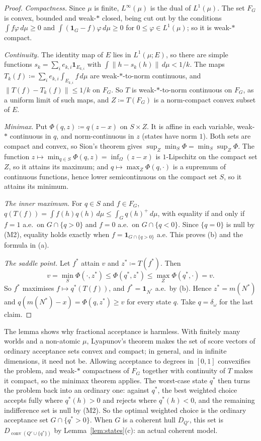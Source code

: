 \documentclass[11pt]{article}
\newcommand{\one}{\mathbf{1}}
\DeclareMathOperator{\conv}{conv}
\theoremstyle{plain}
\theoremstyle{definition}
\theoremstyle{remark}
\begin{document}
\begin{proof}
\emph{Compactness.} Since $\mu$ is finite, $L^\infty(\mu)$ is the dual of $L^1(\mu)$. The set
$F_G$ is convex, bounded and weak-$\ast$ closed, being cut out by the conditions $\int f
\varphi\,d\mu\ge0$ and $\int(\one_G-f)\varphi\,d\mu\ge0$ for $0\le\varphi\in L^1(\mu)$; so it is
weak-$\ast$ compact.

\emph{Continuity.} The identity map of $E$ lies in $L^1(\mu;E)$, so there are simple functions
$s_k=\sum_ie_{k,i}\one_{E_{k,i}}$ with $\int\|h-s_k(h)\|\,d\mu<1/k$. The maps $T_k(f)\coloneqq
\sum_ie_{k,i}\int_{E_{k,i}}f\,d\mu$ are weak-$\ast$-to-norm continuous, and $\|T(f)-T_k(f)\|
\le1/k$ on $F_G$. So $T$ is weak-$\ast$-to-norm continuous on $F_G$, as a uniform limit of
such maps, and $Z\coloneqq T(F_G)$ is a norm-compact convex subset of $E$.

\emph{Minimax.} Put $\Phi(q,z)\coloneqq q(z-x)$ on $S\times Z$. It is affine in each variable,
weak-$\ast$ continuous in $q$, and norm-continuous in $z$ (states have norm $1$). Both sets
are compact and convex, so Sion's theorem \cite{Sion} gives $\sup_Z\min_S\Phi=
\min_S\sup_Z\Phi$. The function $z\mapsto\min_{q\in S}\Phi(q,z)=\inf_\Omega(z-x)$ is $1$-Lipschitz on
the compact set $Z$, so it attains its maximum; and $q\mapsto\max_Z\Phi(q,\cdot)$ is a supremum
of continuous functions, hence lower semicontinuous on the compact set $S$, so it attains its
minimum.

\emph{The inner maximum.} For $q\in S$ and $f\in F_G$, $q(T(f))=\int f(h)q(h)\,d\mu\le\int_G
q(h)^+\,d\mu$, with equality if and only if $f=1$ a.e.\ on $G\cap\{q>0\}$ and $f=0$ a.e.\ on
$G\cap\{q<0\}$. Since $\{q=0\}$ is null by (M2), equality holds exactly when $f=\one_{G\cap
\{q>0\}}$ a.e. This proves (b) and the formula in (a).

\emph{The saddle point.} Let $f^\ast$ attain $v$ and $z^\ast\coloneqq T(f^\ast)$. Then
\[
  v=\min_S\Phi(\cdot,z^\ast)\le\Phi(q^\ast,z^\ast)\le\max_Z\Phi(q^\ast,\cdot)=v .
\]
So $f^\ast$ maximises $f\mapsto q^\ast(T(f))$, and $f^\ast=\one_{N^\ast}$ a.e.\ by (b). Hence
$z^\ast=m(N^\ast)$ and $q(m(N^\ast)-x)=\Phi(q,z^\ast)\ge v$ for every state $q$. Take $q=
\delta_\omega$ for the last claim.
\end{proof}

The lemma shows why fractional acceptance is harmless. With finitely many worlds and
a non-atomic $\mu$, Lyapunov's theorem makes the set of score vectors of ordinary acceptance
sets convex and compact; in general, and in infinite dimensions, it need not be. Allowing acceptance to degrees in $[0,1]$
convexifies the problem, and weak-$\ast$ compactness of $F_G$ together with continuity of $T$
makes it compact, so the minimax theorem applies. The worst-case state $q^\ast$ then turns the
problem back into an ordinary one: against $q^\ast$, the best weighted choice accepts fully
where $q^\ast(h)>0$ and rejects where $q^\ast(h)<0$, and the remaining indifference set is
null by (M2). So the optimal weighted choice is the ordinary acceptance set $G\cap
\{q^\ast>0\}$. When $G$ is a coherent hull $D_{Q'}$, this set is $D_{\conv(Q'\cup\{q^\ast\})}$
by Lemma~\ref{lem:states}(c): an actual coherent model.
\end{document}
